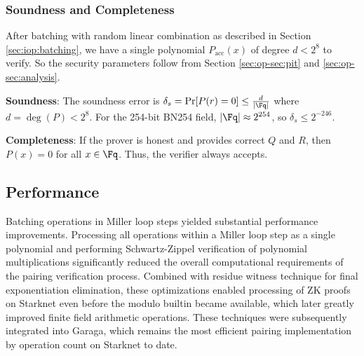\subsubsection{Soundness and Completeness}

After batching with random linear combination as described in Section \ref{sec:iop:batching}, we have a single polynomial $P_\text{acc}(x)$ of degree $d < 2^8$ to verify. So the security parameters follow from Section \ref{sec:op-sec:pit} and \ref{sec:op-sec:analysis}.

\textbf{Soundness}: The soundness error is $\delta_s = \Pr[P(r) = 0] \leq \frac{d}{|\Fq|}$ where $d = \deg(P) < 2^8$. For the 254-bit BN254 field, $|\Fq| \approx 2^{254}$, so $\delta_s \leq 2^{-246}$.

\textbf{Completeness}: If the prover is honest and provides correct $Q$ and $R$, then $P(x) = 0$ for all $x \in \Fq$. Thus, the verifier always accepts.

\subsection{Performance}

Batching operations in Miller loop steps yielded substantial performance improvements. Processing all operations within a Miller loop step as a single polynomial and performing Schwartz-Zippel verification of polynomial multiplications significantly reduced the overall computational requirements of the pairing verification process.
Combined with residue witness technique for final exponentiation elimination\cite{OPP24}, these optimizations enabled processing of ZK proofs on Starknet even before the modulo builtin\cite{sn_mod_builtin} became available, which later greatly improved finite field arithmetic operations. These techniques were subsequently integrated into Garaga, which remains the most efficient pairing implementation by operation count on Starknet to date.
